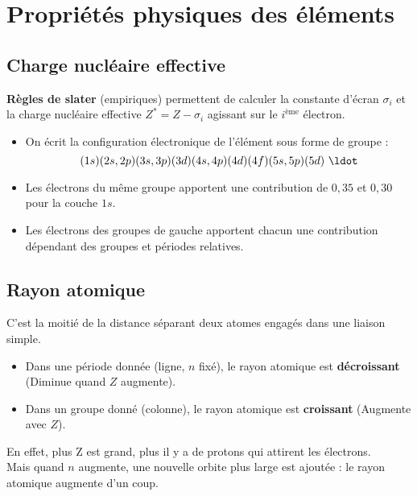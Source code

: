\documentclass[13pt, twoside, a4paper, french, tikz]{report}
\begin{document}
\chapter{Propriétés physiques des éléments}\label{ch:propriete-physique-des-elements}
  
  
  \section{Charge nucléaire effective}\label{sec:charge-nucleaire-effective}
    
    \textbf{Règles de slater} (empiriques) permettent de calculer la constante d'écran $\sigma_i$ et la charge nucléaire effective $Z^* = Z - \sigma_i$ agissant sur le $i^{\text{ème}}$ électron.\\
    
    \begin{itemize}
      \item On écrit la configuration électronique de l'élément sous forme de groupe : \[(1s)(2s, 2p)(3s, 3p)(3d)(4s, 4p)(4d)(4f)(5s, 5p)(5d)\ \ldot\]
      \item Les électrons du même groupe apportent une contribution de $0,35$ et $0,30$ pour la couche $1s$.
      \item Les électrons des groupes de gauche apportent chacun une contribution dépendant des groupes et périodes relatives.
    \end{itemize}
  
  
  \section{Rayon atomique}\label{sec:rayon-atomique}
    
    C'est la moitié de la distance séparant deux atomes engagés dans une liaison simple.
    \begin{itemize}
      \item Dans une période donnée (ligne, $n$ fixé), le rayon atomique est \textbf{décroissant} (Diminue quand $Z$ augmente).
      \item Dans un groupe donné (colonne), le rayon atomique est \textbf{croissant} (Augmente avec $Z$).
    \end{itemize}
    \vspace{7pt}
    En effet, plus Z est grand, plus il y a de protons qui attirent les électrons.\\
    Mais quand $n$ augmente, une nouvelle orbite plus large est ajoutée : le rayon atomique augmente d'un coup.
  
\end{document}
